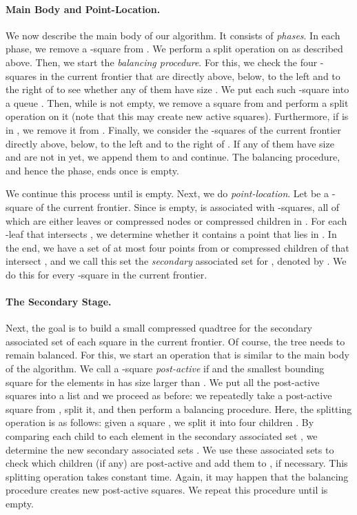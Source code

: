 \documentclass[11pt]{paper}
\begin{document}
    \paragraph{Main Body and Point-Location.}
      We now describe the main body of our algorithm. It consists of 
      \emph{phases}. In each phase, we remove a -square 
       from . We perform a split operation on  as
      described above. Then, we start the \emph{balancing procedure}. 
      For this, we check the four -squares in the
      current frontier that are directly above, below, to the left 
      and to the right of  to see whether any of 
      them have size .
      We put each such -square into a queue . Then, while 
      is not empty, we remove a square  from  and perform a
      split operation on it (note that this may create new active
      squares). Furthermore, if  is in , 
      we remove it from .  Finally, we consider the
      -squares of the current frontier directly above, below, to 
      the left and to the right
      of . If any of them have size  and are not in  yet, we 
      append them to  and continue. The balancing procedure, and 
      hence the phase, ends once  is empty.

      We continue this process until  is empty. Next, we do
       \emph{point-location}. Let  be a
      -square of the current frontier. Since  is empty, 
       is associated with  -squares, all of 
      which are either leaves or compressed nodes or 
      compressed children in . For each -leaf that intersects 
      , we determine whether it contains a point that lies 
      in . In the end, we have a set of
      at most four points from   or compressed children of 
      that intersect , and we call this set the \emph{secondary} associated
      set for , denoted by . We do this for every -square
      in the
      current frontier. 
      
      \paragraph{The Secondary Stage.}
      Next, the goal is to build a small compressed quadtree for the secondary
      associated set of each square in the current frontier. Of course,
      the tree needs to remain balanced.
      For this, we start an operation that is similar to the main body of the 
      algorithm.  We call a -square  \emph{post-active} if 
       and the smallest bounding
      square for the elements in  has size larger than .
      We put all the post-active squares into a list  and we proceed
      as before: we repeatedly take a post-active square from ,
      split it, and then perform a balancing procedure. Here,
      the splitting operation is as follows: given
      a square , we split it into four children .
      By comparing each child  to each element in the secondary associated
      set , we determine the new secondary associated sets 
      . We use these associated sets to check
      which children  (if any) are post-active and add them to ,
      if necessary. This splitting
      operation takes constant time. Again, it may
      happen that the balancing procedure creates new post-active
      squares. We repeat this procedure until 
       is empty.
\end{document}
